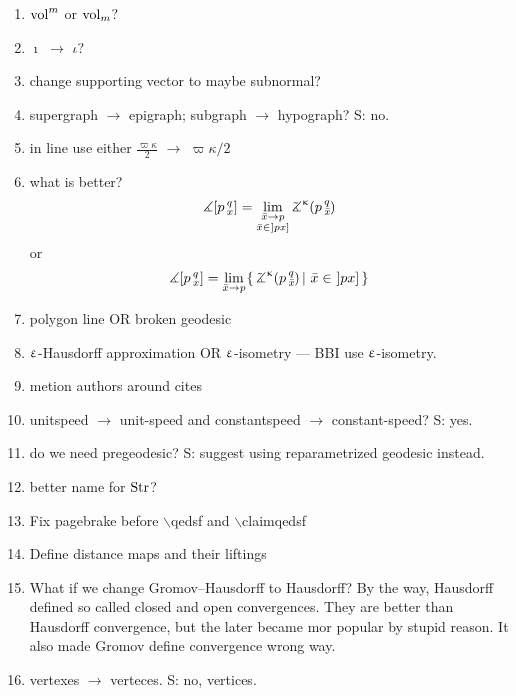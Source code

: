 \begin{enumerate}
\item $\mathop{\rm vol}\nolimits^m$ or $\mathop{\rm vol}\nolimits_m$?

\item $\imath$ $\to$ $\iota$?

\item change supporting vector to maybe subnormal?

\item supergraph $\to$ epigraph; subgraph $\to$ hypograph? S:  no.

\item in line use either $\tfrac{\varpi\kappa}{2}$ $\to$ $\varpi\kappa/2$

\item what is better?
\[\mangle\hinge p q x
=
\lim_{
\substack{
\bar x\to p
\\
\bar x\in\,\l]px\r]}}\angk\kappa p q{\bar x}\]
or 
\[\mangle\hinge p q x
=
\lim_{\bar x\to p}
\set{\angk\kappa p q{\bar x}}{\bar x\in\,\l]px\r]}\]

\item polygon line OR broken geodesic

\item $\upvarepsilon$-Hausdorff approximation OR $\upvarepsilon$-isometry --- BBI use  $\upvarepsilon$-isometry.

\item metion authors around  cites 

\item unitspeed $\to$ unit-speed and constantspeed $\to$ constant-speed?  S:  yes.

\item do we need pregeodesic? S: suggest using reparametrized geodesic instead.

\item better name for $\mathop{\rm Str}\nolimits$?

\item Fix pagebrake before $\backslash$qedsf and $\backslash$claimqedsf

\item Define distance maps and their liftings

\item What if we change Gromov--Hausdorff to Hausdorff?
By the way, Hausdorff defined so called closed and open convergences.
They are better than Hausdorff convergence, but the later became mor popular by stupid reason.
It also made Gromov define convergence wrong way.

\item vertexes $\to$ verteces.  S: no, vertices.


\end{enumerate}

